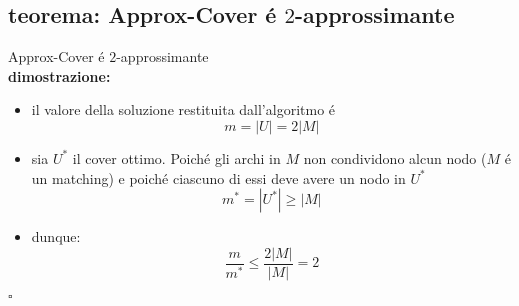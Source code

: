 \subsection*{teorema: Approx-Cover \'e $2$-approssimante}
\begin{flushleft}
	Approx-Cover \'e $2$-approssimante \newline \\
	\textbf{dimostrazione:}
	\begin{itemize}
		\item il valore della soluzione restituita dall'algoritmo \'e $$m=|U|=2|M|$$
		\item sia $U^*$ il cover ottimo. \newline
			Poich\'e gli archi in $M$ non condividono alcun nodo ($M$ \'e un matching) e poich\'e ciascuno di essi deve avere un nodo in $U^*$
			$$m^*=|U^*|\geq|M|$$
		\item dunque: $$\frac{m}{m^*}\leq\frac{2|M|}{|M|}=2$$
	\end{itemize}
	\hfill$\square$
\end{flushleft}


\newpage
